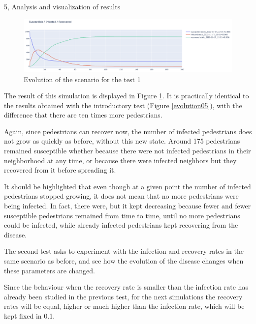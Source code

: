 \documentclass[10pt,a4paper]{article}
\begin{document}
\begin{task}{5, Analysis and visualization of results}
\begin{figure} [H]
    \includegraphics[width=15cm]{images/test1_evo.png}
    \centering
    \caption{Evolution of the scenario for the test 1}
    \label{test1_evo}
\end{figure}

The result of this simulation is displayed in Figure \ref{test1_evo}. It is practically identical to the results obtained with the introductory test (Figure \ref{evolution05}), with the difference that there are ten times more pedestrians.

Again, since pedestrians can recover now, the number of infected pedestrians does not grow as quickly as before, without this new state. Around 175 pedestrians remained susceptible whether because there were not infected pedestrians in their neighborhood at any time, or because there were infected neighbors but they recovered from it before spreading it.

It should be highlighted that even though at a given point the number of infected pedestrians stopped growing, it does not mean that no more pedestrians were being infected. In fact, there were, but it kept decreasing because fewer and fewer susceptible pedestrians remained from time to time, until no more pedestrians could be infected, while already infected pedestrians kept recovering from the disease.

\newpage


The second test asks to experiment with the infection and recovery rates in the same scenario as before, and see how the evolution of the disease changes when these parameters are changed.

Since the behaviour when the recovery rate is smaller than the infection rate has already been studied in the previous test, for the next simulations the recovery rates will be equal, higher or much higher than the infection rate, which will be kept fixed in 0.1.


\end{task}
\end{document}
